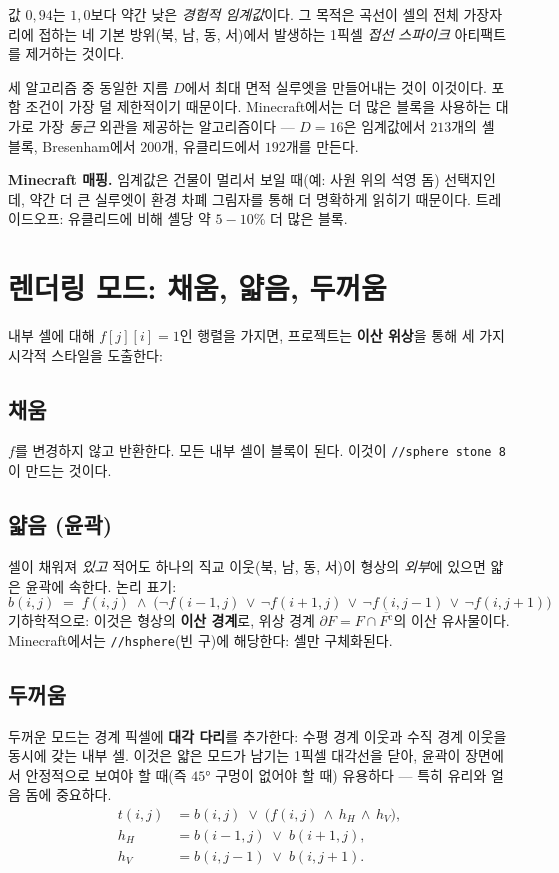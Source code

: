 \documentclass[12pt,a4paper]{scrartcl}
\newcommand{\acc}[1]{\textcolor{accent}{\textbf{#1}}}
\newcommand{\cmd}[1]{\textcolor{earth}{\texttt{\small #1}}}
\begin{document}
값 \acc{$0{,}94$}는 $1{,}0$보다 약간 낮은 \emph{경험적 임계값}이다. 그 목적은 곡선이 셀의 전체 가장자리에 접하는 네 기본 방위(북, 남, 동, 서)에서 발생하는 1픽셀 \emph{접선 스파이크} 아티팩트를 제거하는 것이다.

세 알고리즘 중 동일한 지름 $D$에서 최대 면적 실루엣을 만들어내는 것이 이것이다. 포함 조건이 가장 덜 제한적이기 때문이다. Minecraft에서는 더 많은 블록을 사용하는 대가로 가장 \emph{둥근} 외관을 제공하는 알고리즘이다 — $D=16$은 임계값에서 $213$개의 셸 블록, Bresenham에서 $200$개, 유클리드에서 $192$개를 만든다.

\begin{minec}
\textbf{Minecraft 매핑.} 임계값은 건물이 멀리서 보일 때(예: 사원 위의 석영 돔) 선택지인데, 약간 더 큰 실루엣이 환경 차폐 그림자를 통해 더 명확하게 읽히기 때문이다. 트레이드오프: 유클리드에 비해 셸당 약 $5{-}10\%$ 더 많은 블록.
\end{minec}

\section{렌더링 모드: 채움, 얇음, 두꺼움}

내부 셀에 대해 $f[j][i] = 1$인 행렬을 가지면, 프로젝트는 \acc{이산 위상}을 통해 세 가지 시각적 스타일을 도출한다:

\subsection{채움}
$f$를 변경하지 않고 반환한다. 모든 내부 셀이 블록이 된다. 이것이 \cmd{//sphere stone 8}이 만드는 것이다.

\subsection{얇음 (윤곽)}
셀이 채워져 \emph{있고} 적어도 하나의 직교 이웃(북, 남, 동, 서)이 형상의 \emph{외부}에 있으면 얇은 윤곽에 속한다. 논리 표기:
\[
b(i,j) \;=\; f(i,j) \;\wedge\;
\bigl(\neg f(i{-}1,j)\,\vee\,\neg f(i{+}1,j)\,\vee\,\neg f(i,j{-}1)\,\vee\,\neg f(i,j{+}1)\bigr)
\]
기하학적으로: 이것은 형상의 \acc{이산 경계}로, 위상 경계 $\partial F = F \cap \overline{F^{\mathrm{c}}}$의 이산 유사물이다. Minecraft에서는 \cmd{//hsphere}(빈 구)에 해당한다: 셸만 구체화된다.

\subsection{두꺼움}
두꺼운 모드는 경계 픽셀에 \acc{대각 다리}를 추가한다: 수평 경계 이웃과 수직 경계 이웃을 동시에 갖는 내부 셀. 이것은 얇은 모드가 남기는 1픽셀 대각선을 닫아, 윤곽이 장면에서 안정적으로 보여야 할 때(즉 $45°$ 구멍이 없어야 할 때) 유용하다 — 특히 유리와 얼음 돔에 중요하다.
\begin{align*}
t(i,j) &= b(i,j) \;\vee\; \bigl(f(i,j) \,\wedge\, h_H \,\wedge\, h_V\bigr), \\
h_H &= b(i{-}1,j) \;\vee\; b(i{+}1,j), \\
h_V &= b(i,j{-}1) \;\vee\; b(i,j{+}1).
\end{align*}
\end{document}
